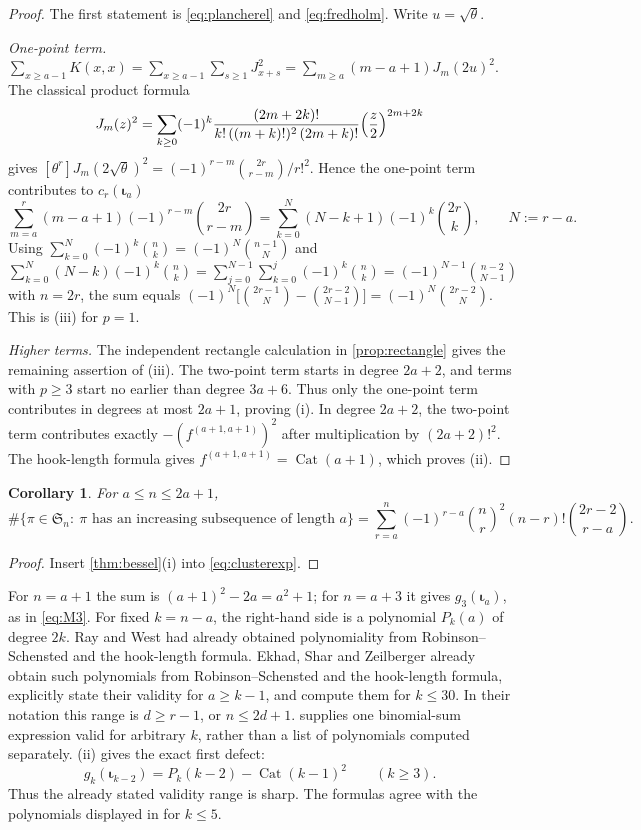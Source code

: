 \documentclass[11pt,reqno]{amsart}
\theoremstyle{plain}
\newtheorem{corollary}[corollary]{Corollary}
\theoremstyle{definition}
\theoremstyle{remark}
\newcommand{\Cat}{\operatorname{Cat}}
\let\greekiota\iota
\renewcommand{\iota}{\boldsymbol{\greekiota}}
\newcommand{\Sym}{\mathfrak{S}}
\begin{document}
\begin{proof}
The first statement is \eqref{eq:plancherel} and \eqref{eq:fredholm}. Write $u=\sqrt\theta$.

\emph{One-point term.} $\sum_{x\ge a-1}K(x,x)=\sum_{x\ge a-1}\sum_{s\ge1}J_{x+s}^2=\sum_{m\ge a}(m-a+1)J_m(2u)^2$. The classical product formula
\[
J_m(z)^2=\sum_{k\ge0}(-1)^k\frac{(2m+2k)!}{k!\,((m+k)!)^2\,(2m+k)!}\Bigl(\frac z2\Bigr)^{2m+2k}
\]
gives $[\theta^r]J_m(2\sqrt\theta)^2=(-1)^{r-m}\binom{2r}{r-m}/r!^2$. Hence the one-point term contributes to $c_r(\iota_a)$
\[
\sum_{m=a}^{r}(m-a+1)(-1)^{r-m}\binom{2r}{r-m}=\sum_{k=0}^{N}(N-k+1)(-1)^k\binom{2r}{k},\qquad N:=r-a .
\]
Using $\sum_{k=0}^{N}(-1)^k\binom nk=(-1)^N\binom{n-1}N$ and $\sum_{k=0}^{N}(N-k)(-1)^k\binom nk=\sum_{j=0}^{N-1}\sum_{k=0}^{j}(-1)^k\binom nk=(-1)^{N-1}\binom{n-2}{N-1}$ with $n=2r$, the sum equals $(-1)^N\bigl[\binom{2r-1}N-\binom{2r-2}{N-1}\bigr]=(-1)^{N}\binom{2r-2}{N}$. This is (iii) for $p=1$.

\emph{Higher terms.} The independent rectangle calculation in
\cref{prop:rectangle} gives the remaining assertion of (iii).
The two-point term starts in degree $2a+2$, and terms with $p\ge3$
start no earlier than degree $3a+6$. Thus only the one-point term
contributes in degrees at most $2a+1$, proving (i).
In degree $2a+2$, the two-point term contributes exactly
$-(f^{(a+1,a+1)})^2$ after multiplication by $(2a+2)!^2$.
The hook-length formula gives $f^{(a+1,a+1)}=\Cat(a+1)$,
which proves (ii).
\end{proof}

\begin{corollary}\label{cor:LIS}
For $a\le n\le2a+1$,
\[
\#\{\pi\in\Sym_n:\ \pi\text{ has an increasing subsequence of length }a\}=\sum_{r=a}^{n}(-1)^{r-a}\binom nr^2(n-r)!\binom{2r-2}{r-a}.
\]
\end{corollary}

\begin{proof}
Insert \cref{thm:bessel}(i) into \eqref{eq:clusterexp}.
\end{proof}

For $n=a+1$ the sum is $(a+1)^2-2a=a^2+1$; for $n=a+3$
it gives $g_3(\iota_a)$, as in \eqref{eq:M3}. For fixed $k=n-a$, the
right-hand side is a polynomial $P_k(a)$ of degree $2k$.
Ray and West \cite[Prop.~9.6, p.~87]{RayWest2003} had already
obtained polynomiality from Robinson--Schensted and the hook-length
formula. Ekhad, Shar and Zeilberger \cite[p.~2]{ESZ2015} already obtain such
polynomials from Robinson--Schensted and the hook-length formula,
explicitly state their validity for $a\ge k-1$, and compute them for
$k\le30$. In their notation this range is $d\ge r-1$, or $n\le2d+1$.
 supplies one binomial-sum expression valid for arbitrary
$k$, rather than a list of polynomials computed separately.
(ii) gives the exact first defect:
\[
g_k(\iota_{k-2})=P_k(k-2)-\Cat(k-1)^2\qquad(k\ge3).
\]
Thus the already stated validity range is sharp. The formulas agree
with the polynomials displayed in \cite{ESZ2015} for $k\le5$.
\end{document}
